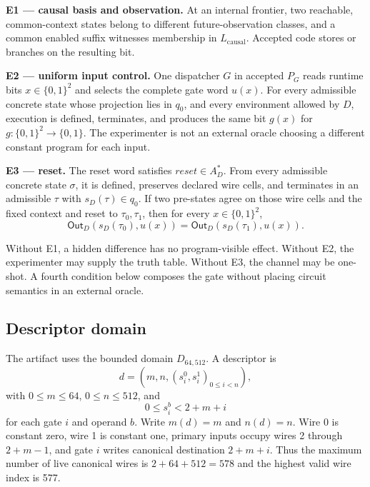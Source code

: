 \documentclass[conference]{IEEEtran}
\begin{document}
\medskip
\noindent\textbf{E1 --- causal basis and observation.}
At an internal frontier, two reachable, common-context states belong to different future-observation classes, and a common enabled suffix witnesses membership in $L_{\mathrm{causal}}$. Accepted code stores or branches on the resulting bit.

\medskip
\noindent\textbf{E2 --- uniform input control.}
One dispatcher $G$ in accepted $P_G$ reads runtime bits $x\in\{0,1\}^2$ and selects the complete gate word $u(x)$. For every admissible concrete state whose projection lies in $q_0$, and every environment allowed by $D$, execution is defined, terminates, and produces the same bit $g(x)$ for $g:\{0,1\}^2\to\{0,1\}$. The experimenter is not an external oracle choosing a different constant program for each input.

\medskip
\noindent\textbf{E3 --- reset.}
The reset word satisfies $\mathit{reset}\in A_D^*$. From every admissible concrete state $\sigma$, it is defined, preserves declared wire cells, and terminates in an admissible $\tau$ with $s_D(\tau)\in q_0$. If two pre-states agree on those wire cells and the fixed context and reset to $\tau_0,\tau_1$, then for every $x\in\{0,1\}^2$,
\begin{equation}
\mathsf{Out}_D(s_D(\tau_0),u(x))
=
\mathsf{Out}_D(s_D(\tau_1),u(x)).
\end{equation}

Without E1, a hidden difference has no program-visible effect. Without E2, the experimenter may supply the truth table. Without E3, the channel may be one-shot. A fourth condition below composes the gate without placing circuit semantics in an external oracle.

\subsection{Descriptor domain}

The artifact uses the bounded domain $D_{64,512}$. A descriptor is
\begin{equation}
d=(m,n,(s_i^0,s_i^1)_{0\le i<n}),
\end{equation}
with $0\le m\le64$, $0\le n\le512$, and
\begin{equation}
0\le s_i^b<2+m+i
\end{equation}
for each gate $i$ and operand $b$. Write $m(d)=m$ and $n(d)=n$. Wire 0 is constant zero, wire 1 is constant one, primary inputs occupy wires 2 through $2+m-1$, and gate $i$ writes canonical destination $2+m+i$. Thus the maximum number of live canonical wires is $2+64+512=578$ and the highest valid wire index is 577.
\end{document}
